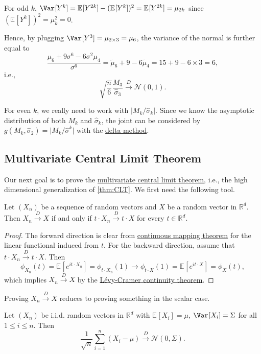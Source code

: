 \begin{note}
	For odd \(k\), \(\Var_{}[Y^k] = \mathbb{E}_{}[Y^{2k} ] - (\mathbb{E}_{}[Y^k] )^2 = \mathbb{E}_{}[Y^{2k} ] = \mu _{2k}\) since \((\mathbb{E}_{}[Y^k] )^2 = \mu _k^2 = 0\).
\end{note}

Hence, by plugging \(\Var_{}[Y^3] = \mu _{2 \times 3} = \mu _6\), the variance of the normal is further equal to
\[
	\frac{\mu _6 + 9 \sigma ^6 - 6 \sigma ^2 \mu _4}{\sigma ^6}
	= \widetilde{\mu} _6 + 9 - 6 \widetilde{\mu} _4
	= 15 + 9 - 6 \times 3
	= 6,
\]
i.e.,
\[
	\sqrt{\frac{n}{6}} \frac{M_3}{\hat{\sigma} _3}
	\overset{D}{\to} \mathcal{N} (0, 1).
\]

For even \(k\), we really need to work with \(\vert M_k / \hat{\sigma} _k \vert \). Since we know the asymptotic distribution of both \(M_k\) and \(\hat{\sigma} _k\), the joint can be considered by \(g(M_k , \hat{\sigma} _2) = \vert M_k / \hat{\sigma} ^k \vert \) with the \hyperref[thm:delta-method]{delta method}.

\subsection{Multivariate Central Limit Theorem}
Our next goal is to prove the \hyperref[thm:multivariate-CLT]{multivariate central limit theorem}, i.e., the high dimensional generalization of \autoref{thm:CLT}. We first need the following tool.

\begin{theorem}\label{thm:Cramer-Wold-device}
	Let \((X_n)\) be a sequence of random vectors and \(X\) be a random vector in \(\mathbb{R} ^d\). Then \(X_n \overset{D}{\to} X\) if and only if \(t \cdot X_n \overset{D}{\to} t \cdot X\) for every \(t \in \mathbb{R} ^d\).
\end{theorem}
\begin{proof}
	The forward direction is clear from \hyperref[thm:continuous-mapping]{continuous mapping theorem} for the linear functional induced from \(t\). For the backward direction, assume that \(t \cdot X_n \overset{D}{\to} t \cdot X\). Then
	\[
		\phi _{X_n}(t)
		= \mathbb{E}_{}[e^{i t \cdot X_n}]
		= \phi _{t \cdot X_n}(1)
		\to \phi _{t \cdot X}(1)
		= \mathbb{E}_{}[e^{i t \cdot X}]
		= \phi _X(t),
	\]
	which implies \(X_n \overset{D}{\to} X\) by the \hyperref[thm:Levy-Cramer-continuity]{Lévy-Cramer continuity theorem}.
\end{proof}

\begin{remark}
	Proving \(X_n \overset{D}{\to} X\) reduces to proving something in the scalar case.
\end{remark}

\begin{theorem}\label{thm:multivariate-CLT}
	Let \((X_n)\) be i.i.d. random vectors in \(\mathbb{R} ^d\) with \(\mathbb{E}_{}[X_i] = \mu \), \(\Var_{}[X_i] = \Sigma \) for all \(1 \leq i \leq n\). Then
	\[
		\frac{1}{\sqrt{n} } \sum_{i=1}^{n} (X_i - \mu )
		\overset{D}{\to} \mathcal{N} (0, \Sigma ).
	\]
\end{theorem}